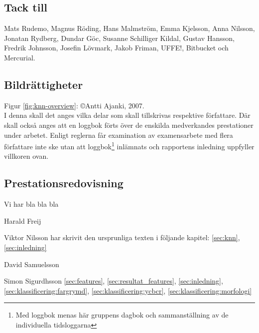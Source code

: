 \documentclass[../rapport_MVEX01-11-05]{subfiles}
\begin{document}
    \subsection*{Tack till}
    Mats Rudemo, Magnus Röding, Hans Malmström, Emma Kjelsson, Anna Nilsson, Jonatan Rydberg, Dundar Göc, Susanne Schilliger Kildal, Gustav Hansson, Fredrik Johnsson, Josefin Lövmark, Jakob Friman, UFFE!, Bitbucket och Mercurial.

    \subsection*{Bildrättigheter}
    Figur \ref{fig:knn-overview}: \copyright Antti Ajanki, 2007.\\

    
I denna skall det anges vilka delar som skall tillskrivas respektive
författare. Där skall också anges att en loggbok förts över de
enskilda medverkandes prestationer under arbetet.
Enligt reglerna får examination av examensarbete med flera författare
inte ske utan att loggbok\footnote{Med loggbok menas här gruppens
dagbok och sammanställning av de individuella tidsloggarna} inlämnats
och rapportens inledning uppfyller villkoren ovan.

\subsection*{Prestationsredovisning}
Vi har bla bla bla

Harald Freij

Viktor Nilsson har skrivit den ursprunliga texten i följande kapitel:
\ref{sec:knn}, \ref{sec:inledning}

David Samuelsson

Simon Sigurdhsson \ref{sec:features}, \ref{sec:resultat_features},
\ref{sec:inledning}, \ref{sec:klassificering:fargrymd},
\ref{sec:klassificering:ycbcr}, \ref{sec:klassificering:morfologi}
\end{document}

